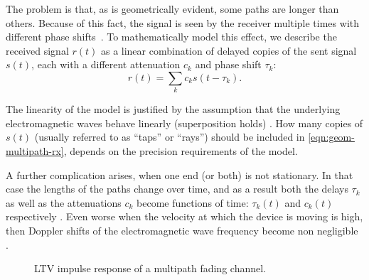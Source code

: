 The problem is that, as is geometrically evident, some paths are longer than others. Because of this fact, the signal is seen by the receiver multiple times with different phase shifts~\cite{Gallager,Messier}. To mathematically model this effect, we describe the received signal \(r(t)\) as a linear combination of delayed copies of the sent signal \(s(t)\), each with a different attenuation \(c_k\) and phase shift \(\tau_k\):
\begin{equation} \label{eqn:geom-multipath-rx}
	r(t) = \sum_k c_k s(t - \tau_k).
\end{equation}

The linearity of the model is justified by the assumption that the underlying electromagnetic waves behave linearly (superposition holds) \cite{Gallager}. How many copies of \(s(t)\) (usually referred to as ``taps'' or ``rays'') should be included in \eqref{eqn:geom-multipath-rx}, depends on the precision requirements of the model.

A further complication arises, when one end (or both) is not stationary. In that case the lengths of the paths change over time, and as a result both the delays \(\tau_k\) as well as the attenuations \(c_k\) become functions of time: \(\tau_k(t)\) and \(c_k(t)\) respectively \cite{Gallager,Messier}. Even worse when the velocity at which the device is moving is high, then Doppler shifts of the electromagnetic wave frequency become non negligible \cite{Gallager}.

\begin{figure}
	\centering
	
	\caption{
		LTV impulse response of a multipath fading channel.
		\label{fig:multipath-impulse-response}
	}
\end{figure}

